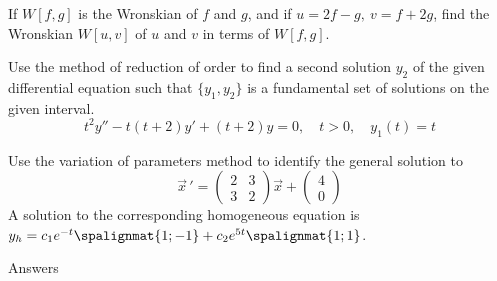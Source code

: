 \documentclass[12pt]{exam}
\begin{document}
\begin{questions}
    \vspace{5cm} 
    
    \question[3] If $W[f, g]$ is the Wronskian of $f$ and $g$, and if $u=2f - g, \ v=f +2g$, find the Wronskian $W[u,v]$ of $u$ and $v$ in terms of $W [ f , g]$.
    
    \vspace{6cm} 
    


    \vspace{6cm} 
    
    \newpage
    
    \question[8] Use the method of reduction of order to find a second solution $y_2$ of the given differential equation such that $\{y_1, y_2\}$ is a fundamental set of solutions on the given interval. $$t^2y'' - t(t+2)y' + (t+2)y=0, \quad t > 0 , \quad y_1(t) = t$$
    
    \newpage  
    
    \question[8] Use the variation of parameters method to identify the general solution to \[\vec{x} \, ' = \left( \begin{array}{rr} 2 & 3 \\ 3 & 2 \end{array} \right) \vec{x}  + \left( \begin{array}{r}  4\\ 0\end{array} \right)  \]
    A solution to the corresponding homogeneous equation is $y_h = c_1e^{-t}\spalignmat{1;-1}+c_2e^{5t}\spalignmat{1;1}$.
        
\end{questions}



\newpage

\large{Answers}
\end{document}
